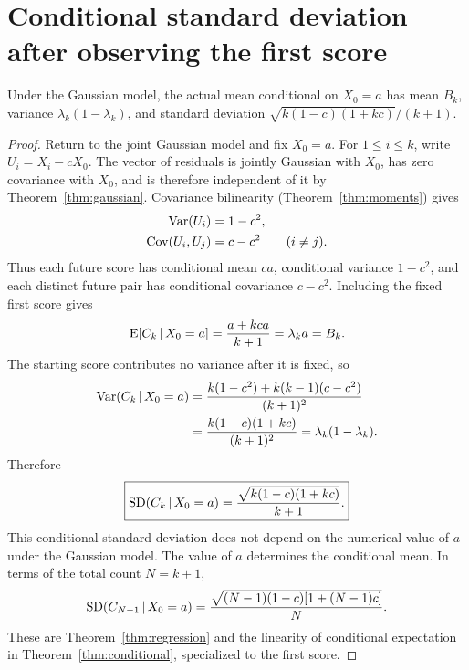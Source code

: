 \section{Conditional standard deviation after observing the first score}
\begin{proposition}
\label{prop:conditional-sd}
Under the Gaussian model, the actual mean conditional on \(X_0=a\) has
mean \(B_k\), variance \(\lambda_k(1-\lambda_k)\), and standard deviation
\(\sqrt{k(1-c)(1+kc)}/(k+1)\).
\end{proposition}
\begin{proof}
Return to the joint Gaussian model and fix \(X_0=a\).
For \(1\leq i\leq k\), write \(U_i=X_i-cX_0\). The vector of residuals
is jointly Gaussian with \(X_0\), has zero covariance with \(X_0\), and
is therefore independent of it by Theorem~\ref{thm:gaussian}.
Covariance bilinearity (Theorem~\ref{thm:moments}) gives
\begin{align*}
  \operatorname{Var}(U_i)&=1-c^2,\\
  \operatorname{Cov}(U_i,U_j)&=c-c^2\qquad(i\ne j).
\end{align*}
Thus each future score has conditional mean \(ca\), conditional variance
\(1-c^2\), and each distinct future pair has conditional covariance
\(c-c^2\). Including the fixed first score gives
\begin{equation}
  \operatorname{E}[C_k\,\vert\, X_0=a]
    =\frac{a+kca}{k+1}=\lambda_k a=B_k.
    \label{eq:actual-mean}
\end{equation}
The starting score contributes no variance after it is fixed, so
\begin{align}
  \operatorname{Var}(C_k\,\vert\, X_0=a)
  &=\frac{k(1-c^2)+k(k-1)(c-c^2)}{(k+1)^2}\notag\\
  &=\frac{k(1-c)(1+kc)}{(k+1)^2}
   =\lambda_k(1-\lambda_k).
  \label{eq:actual-variance}
\end{align}
Therefore
\begin{equation}
  \boxed{\operatorname{SD}(C_k\,\vert\, X_0=a)
    =\frac{\sqrt{k(1-c)(1+kc)}}{k+1}.}
  \label{eq:conditional-sd}
\end{equation}
This conditional standard deviation does not depend on the numerical value
of \(a\) under the Gaussian model. The value of \(a\) determines the
conditional mean. In terms of the total count \(N=k+1\),
\begin{equation}
  \operatorname{SD}(C_{N-1}\,\vert\, X_0=a)
  =\frac{\sqrt{(N-1)(1-c)[1+(N-1)c]}}{N}.
  \label{eq:conditional-sd-total}
\end{equation}
These are Theorem~\ref{thm:regression} and the linearity of conditional
expectation in Theorem~\ref{thm:conditional}, specialized to the first score.
\end{proof}

